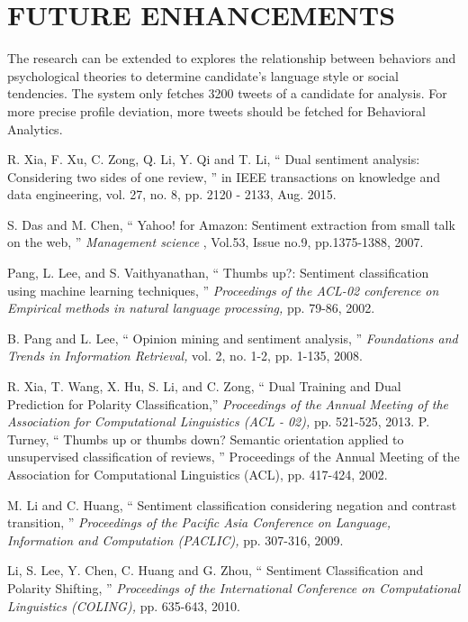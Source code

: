 \documentclass[oneside,a4paper,12pt]{pictreport}
\begin{document}
\chapter{FUTURE ENHANCEMENTS} 
The research can be extended to explores the relationship between behaviors and 
psychological theories to determine candidate's language style or social tendencies.
The system only fetches 3200 tweets of a candidate for analysis. For more precise 
profile deviation, more tweets should be fetched for Behavioral Analytics. 

\begin{thebibliography}{20}



R. Xia, F. Xu, C. Zong, Q. Li, Y. Qi and T. Li, `` Dual sentiment analysis: Considering  two  sides  of  one 
review, '' in IEEE transactions on knowledge and data engineering, vol. 27, no. 8, pp. 2120
-
2133, Aug. 2015.

  S. Das and M. Chen, `` Yahoo! for Amazon: Sentiment extraction from small talk on the web, '' {\em Management science} , Vol.53, Issue no.9, pp.1375-1388, 2007.

  
  
  Pang, L. Lee, and S. Vaithyanathan, `` Thumbs up?: Sentiment classification using machine learning techniques, '' {\em Proceedings of the ACL-02 conference on Empirical methods in natural language processing,}
  pp. 79-86, 2002.
  
  B. Pang and L. Lee, `` Opinion mining and sentiment analysis, '' {\em Foundations
  and Trends in Information Retrieval,} vol. 2, no. 1-2, pp. 1-135, 2008.
  
  R. Xia, T. Wang, X. Hu, S. Li, and C. Zong, `` Dual Training and Dual
Prediction for Polarity Classification,'' {\em Proceedings of the Annual 
Meeting of the Association for Computational Linguistics (ACL - 02),} pp. 521-525,
2013.
  P. Turney, `` Thumbs up or thumbs down? Semantic orientation applied to unsupervised classification of reviews, '' Proceedings of the Annual Meeting of the Association for Computational Linguistics (ACL), pp. 417-424, 2002.

  
  M. Li and C. Huang, `` Sentiment classification considering negation
and contrast transition, '' {\em Proceedings of the Pacific Asia Conference on
Language, Information and Computation (PACLIC),}  pp. 307-316, 2009.


  Li, S. Lee, Y. Chen, C. Huang and G. Zhou, `` Sentiment 
  Classification and Polarity Shifting, '' {\em Proceedings of the International Conference on
  Computational Linguistics (COLING),} pp. 635-643, 2010.
  

\end{thebibliography}
\end{document}
